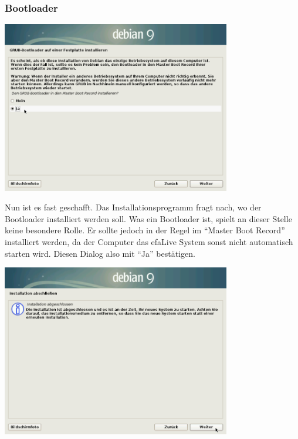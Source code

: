 \documentclass[a4paper,12pt,twoside]{article}
\begin{document}
\subsubsection{Bootloader}
\label{sct:bootloader}

\begin{minipage}{\linewidth}
    \centering
    \captionsetup{type=figure}
    \includegraphics[width=10cm]{screenshots/select_bootloader_mbr.png}
    \label{fig:inst_grub}
\end{minipage}
\bigskip

Nun ist es fast geschafft. Das Installationsprogramm fragt nach, wo der
Bootloader installiert werden soll. Was ein Bootloader ist, spielt an
dieser Stelle keine besondere Rolle. Er sollte jedoch in der Regel im
"`Master Boot Record"' installiert werden, da
der Computer das efaLive System sonst nicht automatisch starten wird.
Diesen Dialog also mit "`Ja"' bestätigen.

\bigskip
\begin{minipage}{\linewidth}
    \centering
    \captionsetup{type=figure}
    \includegraphics[width=10cm]{screenshots/finish_installation.png}
    \label{fig:abschluss}
\end{minipage}
\bigskip
\end{document}
